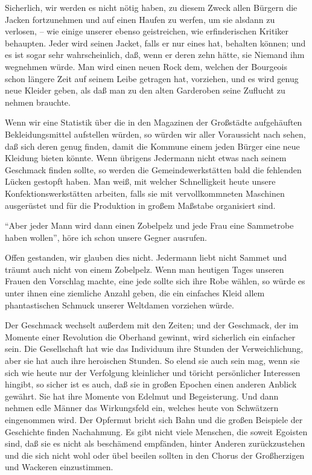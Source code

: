 \documentclass{scrbook}
\begin{document}
Sicherlich, wir werden es nicht nötig haben, zu diesem Zweck allen Bürgern die Jacken fortzunehmen und auf einen Haufen zu werfen, um sie alsdann zu verlosen, – wie einige unserer ebenso geistreichen, wie erfinderischen Kritiker behaupten. Jeder wird seinen Jacket, falls er nur eines hat, behalten können; und es ist sogar sehr wahrscheinlich, daß, wenn er deren zehn hätte, sie Niemand ihm wegnehmen würde. Man wird einen neuen Rock dem, welchen der Bourgeois schon längere Zeit auf seinem Leibe getragen hat, vorziehen, und es wird genug neue Kleider geben, als daß man zu den alten Garderoben seine Zuflucht zu nehmen brauchte.

Wenn wir eine Statistik über die in den Magazinen der Großstädte aufgehäuften Bekleidungsmittel aufstellen würden, so würden wir aller Voraussicht nach sehen, daß sich deren genug finden, damit die Kommune einem jeden Bürger eine neue Kleidung bieten könnte. Wenn übrigens Jedermann nicht etwas nach seinem Geschmack finden sollte, so werden die Gemeindewerkstätten bald die fehlenden Lücken gestopft haben. Man weiß, mit welcher Schnelligkeit heute unsere Konfektionswerkstätten arbeiten, falls sie mit vervollkommneten Maschinen ausgerüstet und für die Produktion in großem Maßstabe organisiert sind.

``Aber jeder Mann wird dann einen Zobelpelz und jede Frau eine Sammetrobe haben wollen'', höre ich schon unsere Gegner ausrufen.

Offen gestanden, wir glauben dies nicht. Jedermann liebt nicht Sammet und träumt auch nicht von einem Zobelpelz. Wenn man heutigen Tages unseren Frauen den Vorschlag machte, eine jede sollte sich ihre Robe wählen, so würde es unter ihnen eine ziemliche Anzahl geben, die ein einfaches Kleid allem phantastischen Schmuck unserer Weltdamen vorziehen würde.

Der Geschmack wechselt außerdem mit den Zeiten; und der Geschmack, der im Momente einer Revolution die Oberhand gewinnt, wird sicherlich ein einfacher sein. Die Gesellschaft hat wie das Individuum ihre Stunden der Verweichlichung, aber sie hat auch ihre heroischen Stunden. So elend sie auch sein mag, wenn sie sich wie heute nur der Verfolgung kleinlicher und töricht persönlicher Interessen hingibt, so sicher ist es auch, daß sie in großen Epochen einen anderen Anblick gewährt. Sie hat ihre Momente von Edelmut und Begeisterung. Und dann nehmen edle Männer das Wirkungsfeld ein, welches heute von Schwätzern eingenommen wird. Der Opfermut bricht sich Bahn und die großen Beispiele der Geschichte finden Nachahmung. Es gibt nicht viele Menschen, die soweit Egoisten sind, daß sie es nicht als beschämend empfänden, hinter Anderen zurückzustehen und die sich nicht wohl oder übel beeilen sollten in den Chorus der Großherzigen und Wackeren einzustimmen.
\end{document}
